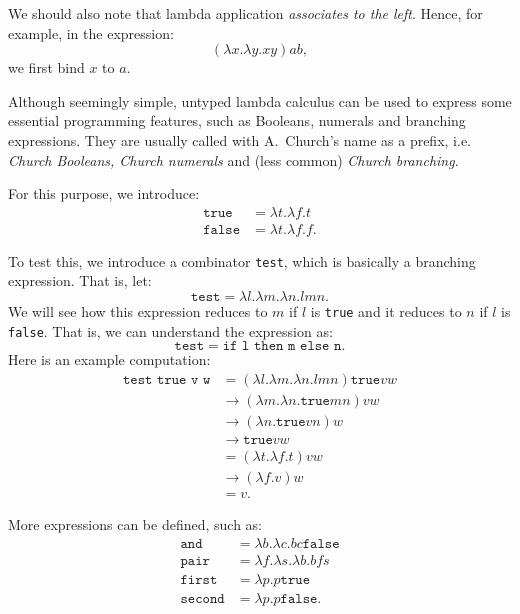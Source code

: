 We should also note that lambda application \emph{associates to the left}.
Hence, for example, in the expression:
\[
  (\lambda x . \lambda y . xy)ab,
\]
we first bind $ x $ to $ a $.

Although seemingly simple, untyped lambda calculus can be used
to express some essential programming features, such as Booleans,
numerals and branching expressions. They are usually called with
A.\ Church's name as a prefix, i.e. \emph{Church Booleans, Church %
  numerals} and (less common) \emph{Church branching}.

For this purpose, we introduce:
\begin{align*}
  \texttt{true} &= \lambda t . \lambda f . t \\
  \texttt{false} &= \lambda t . \lambda f . f.
\end{align*}

To test this, we introduce a combinator \texttt{test}, which
is basically a branching expression. That is, let:
\[
  \texttt{test} = \lambda l . \lambda m . \lambda n . lmn.
\]
We will see how this expression reduces to $ m $ if $ l $ is
\texttt{true} and it reduces to $ n $ if $ l $ is \texttt{false}.
That is, we can understand the expression as:
\[
  \texttt{test} = \texttt{if l then m else n}.
\]
Here is an example computation:
\begin{align*}
  \texttt{test true v w} &= (\lambda l . \lambda m . \lambda n . lmn) \texttt{true} v w \\
                         &\to (\lambda m . \lambda n . \texttt{true} m n) v w \\
                         &\to (\lambda n . \texttt{true} v n) w \\
                         &\to \texttt{true} v w \\
                         &= (\lambda t . \lambda f . t) vw \\
                         &\to (\lambda f . v) w \\
                         &= v.
\end{align*}

More expressions can be defined, such as:
\begin{align*}
  \texttt{and} &= \lambda b . \lambda c . bc \texttt{false} \\
  \texttt{pair} &= \lambda f . \lambda s . \lambda b . bfs \\
  \texttt{first} &= \lambda p . p \texttt{true} \\
  \texttt{second} &= \lambda p . p \texttt{false}.
\end{align*}

